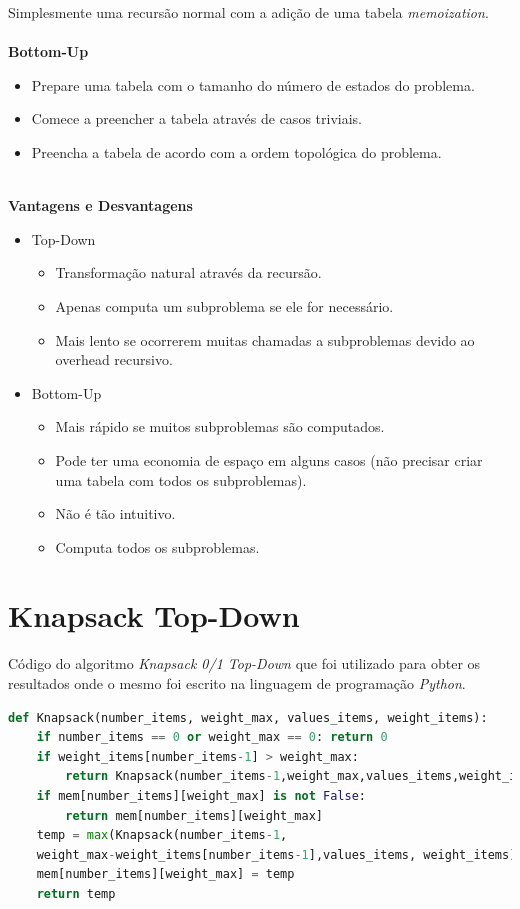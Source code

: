 \documentclass[a4paper, 12pt]{article}
\begin{document}
Simplesmente uma recursão normal com a adição de uma tabela {\it memoization}. \\~\\
{\bf Bottom-Up} 
\begin{itemize}
    \item Prepare uma tabela com o tamanho do número de estados do problema.
    \item Comece a preencher a tabela através de casos triviais.
    \item Preencha a tabela de acordo com a ordem topológica do problema.\\~\\
\end{itemize}
{\bf Vantagens e Desvantagens}
\begin{itemize}
    \item Top-Down
    \begin{itemize}
        \item Transformação natural através da recursão.
        \item Apenas computa um subproblema se ele for necessário.
        \item Mais lento se ocorrerem muitas chamadas a subproblemas devido ao overhead recursivo.
    \end{itemize}
    \item Bottom-Up
    \begin{itemize}
        \item Mais rápido se muitos subproblemas são computados.
        \item Pode ter uma economia de espaço em alguns casos (não precisar criar uma tabela com todos os subproblemas).
        \item Não é tão intuitivo.
        \item Computa todos os subproblemas.
    \end{itemize}
\end{itemize}


\clearpage
\section{Knapsack Top-Down}\label{sec:topdown}
Código do algoritmo {\it Knapsack 0/1 Top-Down} que foi utilizado para obter os resultados onde o mesmo foi escrito
na linguagem de programação {\it Python}.\\
\begin{lstlisting}[language=Python, caption=Top-Down, label=alg:topdown]
def Knapsack(number_items, weight_max, values_items, weight_items):
    if number_items == 0 or weight_max == 0: return 0
    if weight_items[number_items-1] > weight_max: 
        return Knapsack(number_items-1,weight_max,values_items,weight_items)
    if mem[number_items][weight_max] is not False: 
        return mem[number_items][weight_max]    
    temp = max(Knapsack(number_items-1, 
    weight_max-weight_items[number_items-1],values_items, weight_items)+values_items[number_items-1], Knapsack(number_items-1, weight_max, values_items, weight_items))    
    mem[number_items][weight_max] = temp
    return temp
\end{lstlisting}
\end{document}
